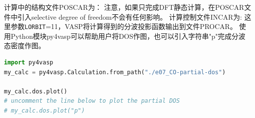 计算中的结构文件\textrm{POSCAR}为：
{\fontsize{8.2pt}{6.2pt}\selectfont{
}}
注意，如果只完成\textrm{DFT}静态计算，在\textrm{POSCAR}文件中引入\textrm{selective degree of freedom}不会有任何影响。
计算控制文件\textrm{INCAR}为:
{\fontsize{8.2pt}{6.2pt}\selectfont{
}}
这里参数\texttt{LORBIT}=11，\textrm{VASP}将计算得到的分波投影函数输出到文件\textrm{PROCAR}。
使用\textrm{Python}模块\textrm{py4vasp}可以帮助用户将\textrm{DOS}作图，也可以引入字符串\textrm{"p"}完成分波态密度作图。
\begin{lstlisting}[language=Python, basicstyle=\ttfamily, keywordstyle=\color{blue}, stringstyle=\color{red!70!black}]
import py4vasp
my_calc = py4vasp.Calculation.from_path("./e07_CO-partial-dos")

my_calc.dos.plot()
# uncomment the line below to plot the partial DOS
# my_calc.dos.plot("p")
\end{lstlisting}
